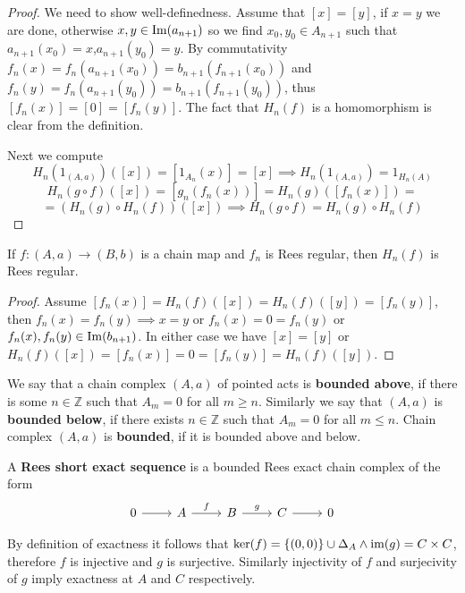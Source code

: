 \begin{proof}[Proof]
    We need to show well-definedness. Assume that $[x]=[y]$, if $x=y$ we are done, otherwise $x,y\in\mathrm{Im}(a_{n+1})$ so we 
    find $x_0,y_0\in A_{n+1}$ such that $a_{n+1}(x_0) = x$,$a_{n+1}(y_0)=y$. By commutativity $f_n(x)=f_n(a_{n+1}(x_0))=b_{n+1}(f_{n+1}(x_0))$
    and $f_n(y) = f_n(a_{n+1}(y_0))=b_{n+1}(f_{n+1}(y_0))$, thus $[f_n(x)]=[0]=[f_n(y)]$. The fact that $H_n(f)$ is a homomorphism 
    is clear from the definition.\par 
    Next we compute
    \[
        H_n(1_{(A,a)})([x]) = [1_{A_n}(x)] = [x] \implies H_n(1_{(A,a)}) = 1_{H_n(A)}
    \]
    \[
        H_n(g\circ f)([x]) = [g_n(f_n(x))] = H_n(g)([f_n(x)]) =
    \]
    \[
         =(H_n(g)\circ H_n(f))([x]) \implies H_n(g\circ f) = H_n(g)\circ H_n(f)
    \]
\end{proof}
\begin{lemma}
    If $f: (A,a)\to (B,b)$ is a chain map and $f_n$ is Rees regular, then $H_n(f)$ is Rees regular.
\end{lemma}
\begin{proof}[Proof]
    Assume $[f_n(x)]=H_n(f)([x])=H_n(f)([y])=[f_n(y)]$, then $f_n(x)=f_n(y) \implies x=y$ or $f_n(x)=0=f_n(y)$ or 
    $f_n(x),f_n(y)\in\mathrm{Im}(b_{n+1})$. In either case we have $[x]=[y]$ or $H_n(f)([x])=[f_n(x)]=0=[f_n(y)]=H_n(f)([y])$.
\end{proof}
\begin{definition}
    We say that a chain complex $(A,a)$ of pointed acts is \textbf{bounded above}, if there is some $n\in\mathbb{Z}$ such that 
    $A_m=0$ for all $m\geq n$. Similarly we say that $(A,a)$ is \textbf{bounded below}, if there exists $n\in\mathbb{Z}$ such that 
    $A_m=0$ for all $m\leq n$. Chain complex $(A,a)$ is \textbf{bounded}, if it is bounded above and below.
\end{definition}
\begin{definition}
    A \textbf{Rees short exact sequence} is a bounded Rees exact chain complex of the form
    \[\begin{tikzcd}
        0 & A & B & C & 0
        \arrow[from=1-1, to=1-2]
        \arrow["f", from=1-2, to=1-3]
        \arrow["g", from=1-3, to=1-4]
        \arrow[from=1-4, to=1-5]
    \end{tikzcd}\]
\end{definition}
\begin{remark}
    By definition of exactness it follows that $\mathrm{ker}(f) = \{(0,0)\}\cup\Delta_A \land \text{im}(g)= C\times C$, therefore 
    $f$ is injective and $g$ is surjective. Similarly injectivity of $f$ and surjecivity of $g$ imply exactness at $A$ 
    and $C$ respectively.
\end{remark}
